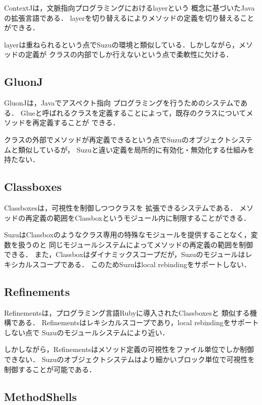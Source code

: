 \documentclass{ipsjprosym}
\begin{document}
ContextJ\cite{AppeltauerMalte:2011}は，文脈指向プログラミングにおけるlayerという
概念に基づいたJavaの拡張言語である．
layerを切り替えるによりメソッドの定義を切り替えることができる．

layerは重ねられるという点でSuzuの環境と類似している．しかしながら，メソッドの定義が
クラスの内部でしか行えないという点で柔軟性に欠ける．

\subsection{GluonJ}

GluonJ\cite{Chiba:2010:MMC:1869459.1869503}は，Javaでアスペクト指向
プログラミングを行うためのシステムである．
Glueと呼ばれるクラスを定義することによって，既存のクラスについてメソッドを再定義することが
できる．

クラスの外部でメソッドが再定義できるという点でSuzuのオブジェクトシステムと類似しているが，
Suzuと違い定義を局所的に有効化・無効化する仕組みを持たない．

\subsection{Classboxes}

Classboxes\cite{Bergel:2005:CCV:1646591.1646599}は，可視性を制御しつつクラスを
拡張できるシステムである．
メソッドの再定義の範囲をClassboxというモジュール内に制限することができる．

SuzuはClassboxのようなクラス専用の特殊なモジュールを提供することなく，変数を扱うのと
同じモジュールシステムによってメソッドの再定義の範囲を制御できる．
また，Classboxはダイナミックスコープだが，Suzuのモジュールはレキシカルスコープである．
このためSuzuはlocal rebindingをサポートしない．

\subsection{Refinements}

Refinements\cite{Maeda:2013}は，プログラミング言語Rubyに導入されたClassboxesと
類似する機構である．
Refinementsはレキシカルスコープであり，local rebindingをサポートしない点で
Suzuのモジュールシステムにより近い．

しかしながら，Refinementsはメソッド定義の可視性をファイル単位でしか制御できない．
Suzuのオブジェクトシステムはより細かいブロック単位で可視性を制御することが可能である．

\subsection{MethodShells}
\end{document}
